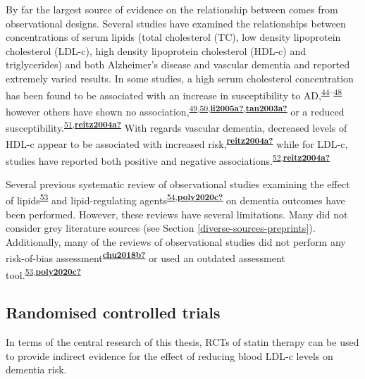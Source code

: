 \documentclass[a4paper, twoside]{templates/ociamthesis}
\begin{document}
By far the largest source of evidence on the relationship between comes from observational designs. Several studies have examined the relationships between concentrations of serum lipids (total cholesterol (TC), low density lipoprotein cholesterol (LDL-c), high density lipoprotein cholesterol (HDL-c) and triglycerides) and both Alzheimer's disease and vascular dementia and reported extremely varied results. In some studies, a high serum cholesterol concentration has been found to be associated with an increase in susceptibility to AD,\textsuperscript{\protect\hyperlink{ref-kivipelto2002}{44}--\protect\hyperlink{ref-whitmer2005}{48}} however others have shown no association,\textsuperscript{\protect\hyperlink{ref-mainous2005}{49},\protect\hyperlink{ref-mielke2010}{50},\protect\hyperlink{ref-li2005a}{\textbf{li2005a?}},\protect\hyperlink{ref-tan2003a}{\textbf{tan2003a?}}} or a reduced susceptibility.\textsuperscript{\protect\hyperlink{ref-mielke2005}{51},\protect\hyperlink{ref-reitz2004a}{\textbf{reitz2004a?}}} With regards vascular dementia, decreased levels of HDL-c appear to be associated with increased risk,\textsuperscript{\protect\hyperlink{ref-reitz2004a}{\textbf{reitz2004a?}}} while for LDL-c, studies have reported both positive and negative associations.\textsuperscript{\protect\hyperlink{ref-moroney1999}{52},\protect\hyperlink{ref-reitz2004a}{\textbf{reitz2004a?}}}

Several previous systematic review of observational studies examining the effect of lipids\textsuperscript{\protect\hyperlink{ref-anstey2015}{53}} and lipid-regulating agents\textsuperscript{\protect\hyperlink{ref-chu2018}{54},\protect\hyperlink{ref-poly2020c}{\textbf{poly2020c?}}} on dementia outcomes have been performed. However, these reviews have several limitations. Many did not consider grey literature sources (see Section \ref{diverse-sources-preprints}). Additionally, many of the reviews of observational studies did not perform any risk-of-bias assessment\textsuperscript{\protect\hyperlink{ref-chu2018b}{\textbf{chu2018b?}}} or used an outdated assessment tool.\textsuperscript{\protect\hyperlink{ref-anstey2015}{53},\protect\hyperlink{ref-poly2020c}{\textbf{poly2020c?}}}

\hypertarget{randomised-controlled-trials}{%
\subsection{Randomised controlled trials}\label{randomised-controlled-trials}}

In terms of the central research of this thesis, RCTs of statin therapy can be used to provide indirect evidence for the effect of reducing blood LDL-c levels on dementia risk.
\end{document}
